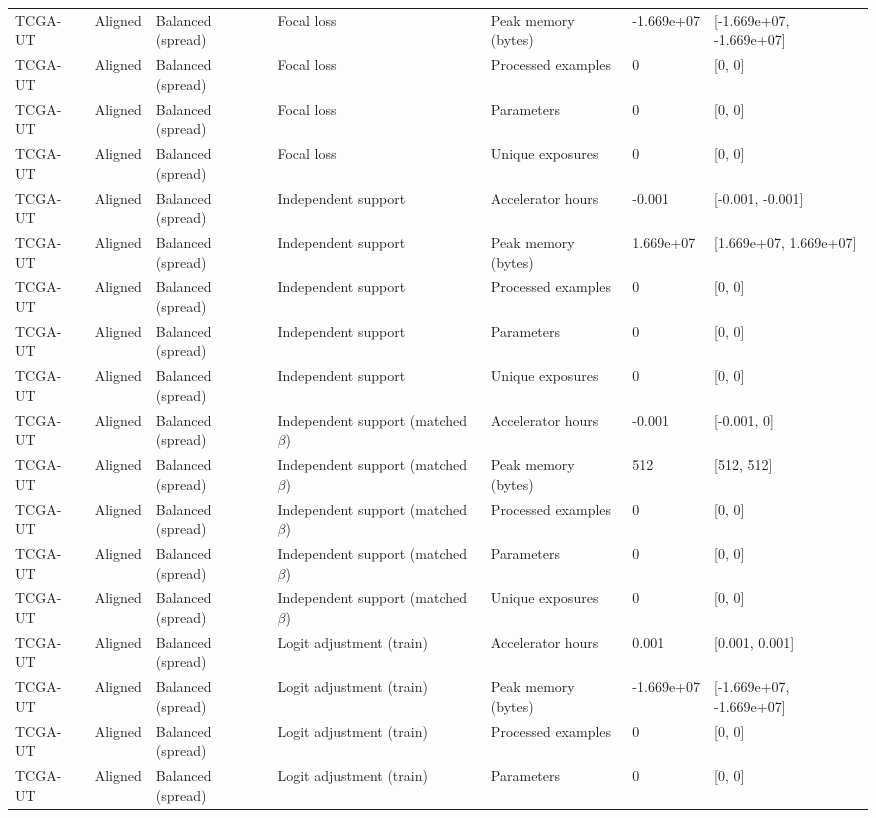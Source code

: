 \begin{longtable}{lllllll}
TCGA-UT & Aligned & Balanced (spread) & Focal loss & Peak memory (bytes) & -1.669e+07 & [-1.669e+07, -1.669e+07] \\
TCGA-UT & Aligned & Balanced (spread) & Focal loss & Processed examples & 0 & [0, 0] \\
TCGA-UT & Aligned & Balanced (spread) & Focal loss & Parameters & 0 & [0, 0] \\
TCGA-UT & Aligned & Balanced (spread) & Focal loss & Unique exposures & 0 & [0, 0] \\
TCGA-UT & Aligned & Balanced (spread) & Independent support & Accelerator hours & -0.001 & [-0.001, -0.001] \\
TCGA-UT & Aligned & Balanced (spread) & Independent support & Peak memory (bytes) & 1.669e+07 & [1.669e+07, 1.669e+07] \\
TCGA-UT & Aligned & Balanced (spread) & Independent support & Processed examples & 0 & [0, 0] \\
TCGA-UT & Aligned & Balanced (spread) & Independent support & Parameters & 0 & [0, 0] \\
TCGA-UT & Aligned & Balanced (spread) & Independent support & Unique exposures & 0 & [0, 0] \\
TCGA-UT & Aligned & Balanced (spread) & Independent support (matched $\beta$) & Accelerator hours & -0.001 & [-0.001, 0] \\
TCGA-UT & Aligned & Balanced (spread) & Independent support (matched $\beta$) & Peak memory (bytes) & 512 & [512, 512] \\
TCGA-UT & Aligned & Balanced (spread) & Independent support (matched $\beta$) & Processed examples & 0 & [0, 0] \\
TCGA-UT & Aligned & Balanced (spread) & Independent support (matched $\beta$) & Parameters & 0 & [0, 0] \\
TCGA-UT & Aligned & Balanced (spread) & Independent support (matched $\beta$) & Unique exposures & 0 & [0, 0] \\
TCGA-UT & Aligned & Balanced (spread) & Logit adjustment (train) & Accelerator hours & 0.001 & [0.001, 0.001] \\
TCGA-UT & Aligned & Balanced (spread) & Logit adjustment (train) & Peak memory (bytes) & -1.669e+07 & [-1.669e+07, -1.669e+07] \\
TCGA-UT & Aligned & Balanced (spread) & Logit adjustment (train) & Processed examples & 0 & [0, 0] \\
TCGA-UT & Aligned & Balanced (spread) & Logit adjustment (train) & Parameters & 0 & [0, 0] \\

\end{longtable}
